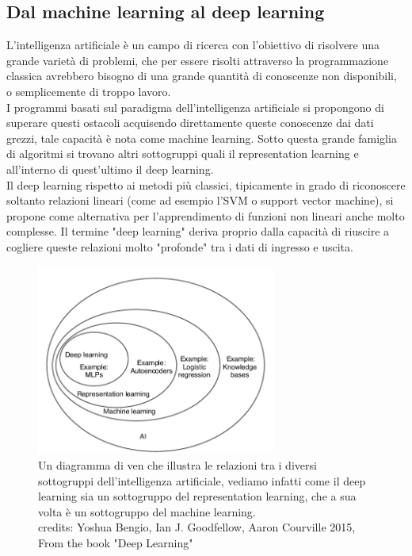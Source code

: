 \subsection{Dal machine learning al deep learning}
L'intelligenza artificiale è un campo di ricerca con l'obiettivo di risolvere una grande varietà di problemi,
che per essere risolti attraverso la programmazione classica avrebbero bisogno di una grande quantità di conoscenze non disponibili, o semplicemente di troppo lavoro.\\
I programmi basati sul paradigma dell'intelligenza artificiale si propongono di superare questi ostacoli acquisendo direttamente queste conoscenze 
dai dati grezzi, tale capacità è nota come machine learning.
Sotto questa grande famiglia di algoritmi si trovano altri sottogruppi quali il representation learning e all'interno di quest'ultimo il deep learning.\\ 
Il deep learning rispetto ai metodi più classici, tipicamente in grado di riconoscere soltanto relazioni lineari (come ad esempio l'SVM o support vector machine), 
si propone come alternativa per l'apprendimento di funzioni non lineari anche molto complesse.
Il termine "deep learning" deriva proprio dalla capacità di riuscire a cogliere queste relazioni molto "profonde" tra i dati di ingresso e uscita.

\begin{figure}[H]
    \centering
    \includegraphics[width=0.7\textwidth]{imgs/AI_venn_diagram.png}
    \caption{Un diagramma di ven che illustra le relazioni tra i diversi sottogruppi dell'intelligenza artificiale, vediamo infatti come
    il deep learning sia un sottogruppo del representation learning, che a sua volta è un sottogruppo del machine learning.\\
    credits: Yoshua Bengio, Ian J. Goodfellow, Aaron Courville 2015, From the book "Deep Learning"\\}
    \label{fig:ai_venn_diagram}
\end{figure}

